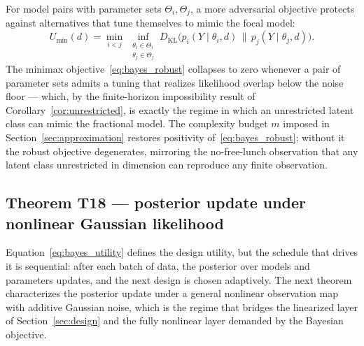 For model pairs with parameter sets $\Theta_i, \Theta_j$, a more adversarial objective protects against alternatives that tune themselves to mimic the focal model:
\begin{equation}
U_{\min}(d)
= \min_{i < j}\, \inf_{\substack{\theta_i \in \Theta_i \\ \theta_j \in \Theta_j}}
D_{\mathrm{KL}}\!\bigl(
p_i(Y \mid \theta_i, d)\,\big\|\, p_j(Y \mid \theta_j, d)
\bigr).
\label{eq:bayes_robust}
\end{equation}
The minimax objective~\eqref{eq:bayes_robust} collapses to zero whenever a pair of parameter sets admits a tuning that realizes likelihood overlap below the noise floor --- which, by the finite-horizon impossibility result of Corollary~\ref{cor:unrestricted}, is exactly the regime in which an unrestricted latent class can mimic the fractional model. The complexity budget $m$ imposed in Section~\ref{sec:approximation} restores positivity of~\eqref{eq:bayes_robust}; without it the robust objective degenerates, mirroring the no-free-lunch observation that any latent class unrestricted in dimension can reproduce any finite observation.

\subsection{Theorem T18 --- posterior update under nonlinear Gaussian likelihood}
\label{subsec:bayes:T18}

Equation~\eqref{eq:bayes_utility} defines the design utility, but the schedule that drives it is sequential: after each batch of data, the posterior over models and parameters updates, and the next design is chosen adaptively. The next theorem characterizes the posterior update under a general nonlinear observation map with additive Gaussian noise, which is the regime that bridges the linearized layer of Section~\ref{sec:design} and the fully nonlinear layer demanded by the Bayesian objective.

